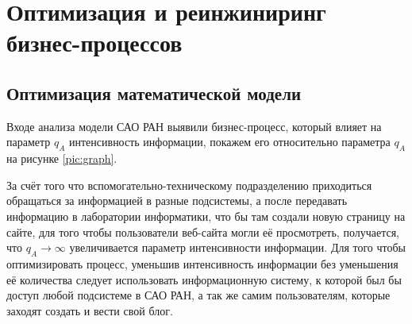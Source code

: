 \section{Оптимизация и реинжиниринг бизнес-процессов}
\subsection{Оптимизация математической модели}
Входе анализа модели САО РАН выявили бизнес-процесс, который влияет на параметр $q_A$ интенсивность информации, покажем его относительно параметра $q_A$ на рисунке \ref{pic:graph}.


За счёт того что вспомогательно-техническому подразделению приходиться обращаться за информацией в разные подсистемы, а после передавать информацию в лаборатории информатики, что бы там создали новую страницу на сайте, для того чтобы пользователи веб-сайта могли её просмотреть, получается, что $q_A \rightarrow \infty$ увеличивается параметр интенсивности информации. Для того чтобы оптимизировать процесс, уменьшив интенсивность информации без уменьшения её количества следует использовать информационную систему, к которой был бы доступ любой подсистеме в САО РАН, а так же самим пользователям, которые заходят создать и вести свой блог.
\pagebreak